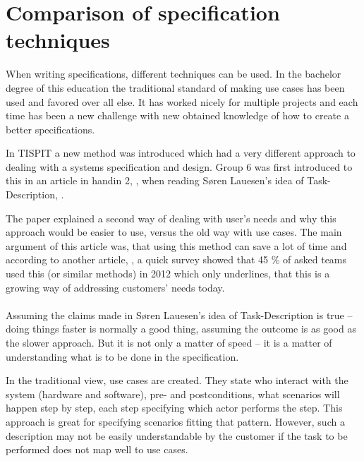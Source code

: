 \documentclass[Main]{subfiles}
\begin{document}
\section{Comparison of specification techniques}

When writing specifications, different techniques can be used.
In the bachelor degree of this education the traditional standard of making use cases has been used and favored over all else.
It has worked nicely for multiple projects and each time has been a new challenge with new obtained knowledge of how to create a better specifications.

In TISPIT a new method was introduced  which had a very different approach to dealing with a systems specification and design.
Group 6 was first introduced to this in an article in handin 2, \parencite[]{HI2}, when reading Søren Lauesen's idea of Task-Description, \parencite[]{Task}.

The paper explained a second way of dealing with user's needs and why this approach would be easier to use, versus the old way with use cases.
The main argument of this article was, that using this method can save a lot of time and according to another article, \parencite[]{Task2}, a quick survey showed that 45 \% of asked teams used this (or similar methods) in 2012 which only underlines, that this is a growing way of addressing customers' needs today.
\\
\\
Assuming the claims made in Søren Lauesen's idea of Task-Description \parencite[]{Task} is true -- doing things faster is normally a good thing, assuming the outcome is as good as the slower approach.
But it is not only a matter of speed -- it is a matter of understanding what is to be done in the specification.

In the traditional view, use cases are created.
They state who interact with the system (hardware and software), pre- and postconditions, what scenarios will happen step by step, each step specifying which actor performs the step.
This approach is great for specifying scenarios fitting that pattern. However, such a description may not be easily understandable by the customer  if the task to be performed does not map well to use cases. 
\end{document}
